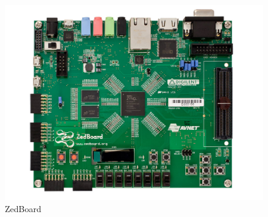 \documentclass[a4paper,12pt,oneside]{book}
\begin{document}
\begin{figure}[h!]
    \centering
    \includegraphics[scale=0.205]{images/zedboard.jpg}
    \caption{ZedBoard}
    \label{figure:zed}
\end{figure}
\end{document}
